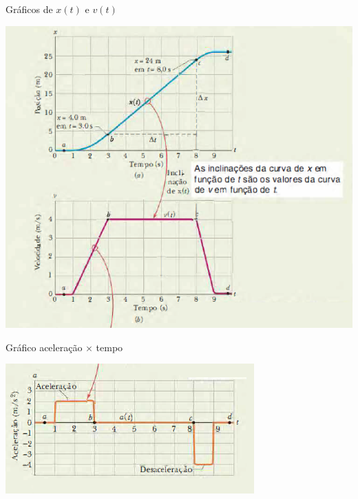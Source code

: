 \documentclass[xcolor=dvipsnames,table]{beamer}
\begin{document}
	\begin{frame}{Gráficos de $x(t)$ e $v(t)$}
		\begin{center}
			\includegraphics[scale=0.6]{images/fig2-6ab}
		\end{center}
	\end{frame}

	\begin{frame}{Gráfico aceleração $\times$ tempo}
		\begin{center}
			\includegraphics[scale=0.7]{images/fig2-6c}
		\end{center}
	\end{frame}
\end{document}

